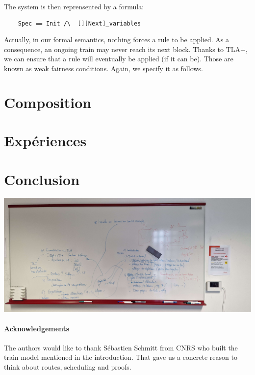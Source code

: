 \documentclass[runningheads]{llncs}
\begin{document}
The system is then reprensented by a formula:
\begin{verbatim}
    Spec == Init /\  [][Next]_variables
\end{verbatim}%

Actually, in our formal semantics, nothing forces a rule to be applied. As a consequence, an ongoing train may never reach its next block. Thanks to TLA+, we can ensure that a rule will eventually be applied (if it can be). Those are known as weak fairness conditions. Again, we specify it as follows. 

\section{Composition}
\label{sec:composition}

\section{Expériences}
\label{sec:experiments}


\section{Conclusion}
\label{sec:conclusion}

\includegraphics[scale=0.1]{img/sommaire_tableau.jpg}

\paragraph{Acknowledgements} The authors would like to thank Sébastien Schmitt from CNRS who built the train model mentioned in the introduction. That gave us a concrete reason to think about routes, scheduling and proofs. 



\end{document}
